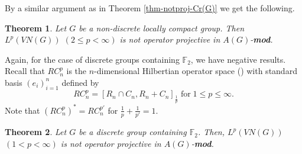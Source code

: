 \documentclass[10pt]{amsart}
\newtheorem{thm}{Theorem}
\numberwithin{thm}{section}
\numberwithin{equation}{section}
\begin{document}
By a similar argument as in Theorem \ref{thm-notproj-Cr(G)} we get the following.
	\begin{thm}
	Let $G$ be a non-discrete locally compact group.
	Then $L^p(VN(G))$ $(2\le p <\infty)$ is not operator projective in $A(G)$-{\bf mod}.
	\end{thm}

Again, for the case of discrete groups containing $\mathbb{F}_2$, we have negative results.
Recall that $RC^p_n$ is the $n$-dimensional Hilbertian operator space (\cite{P03}) with standard basis $(e_i)^n_{i=1}$ defined by
	$$RC^p_n = [R_n\cap C_n, R_n+C_n]_{\frac{1}{p}}\; \text{for}\; 1\le p \le \infty.$$
Note that $(RC^p_n)^* = RC^{p'}_n$ for $\frac{1}{p} + \frac{1}{p'} = 1$.

	\begin{thm}\label{thm-free-Lp}
	Let $G$ be a discrete group containing $\mathbb{F}_2$.
	Then, $L^p(VN(G))$ $(1<p<\infty)$ is not operator projective in $A(G)$-{\bf mod}.
	\end{thm}
\end{document}
